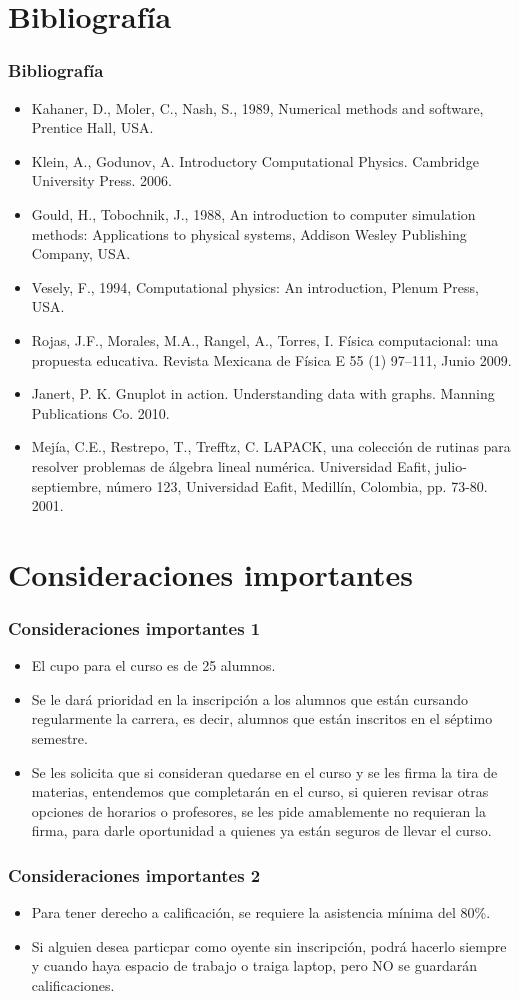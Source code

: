 \documentclass[12pt]{beamer}
\begin{document}
\section{Bibliografía}
\begin{frame}
\frametitle{Bibliografía}
\fontsize{10}{10}\selectfont
\begin{itemize}
\item Kahaner, D., Moler, C., Nash, S., 1989, Numerical methods and software, Prentice Hall, USA.
\item Klein, A., Godunov, A. Introductory Computational Physics. Cambridge University Press. 2006.
\item Gould, H., Tobochnik, J., 1988, An introduction to computer simulation methods: Applications to physical systems, Addison Wesley Publishing Company, USA.
\item Vesely, F., 1994, Computational physics: An introduction, Plenum Press, USA.
\item Rojas, J.F., Morales, M.A., Rangel, A., Torres, I. Física computacional: una propuesta educativa. Revista Mexicana de Física E 55 (1) 97–111, Junio 2009.
\item Janert, P. K. Gnuplot in action. Understanding data with graphs. Manning Publications Co. 2010.
\item Mejía, C.E., Restrepo, T., Trefftz, C. LAPACK, una colección de rutinas para resolver problemas de álgebra lineal numérica. Universidad Eafit, julio-septiembre, número 123, Universidad Eafit, Medillín, Colombia, pp. 73-80. 2001.
\end{itemize}
\end{frame}
\section{Consideraciones importantes}
\begin{frame}
\frametitle{Consideraciones importantes 1}
\begin{itemize}
\item El cupo para el curso es de 25 alumnos.
\item Se le dará prioridad en la inscripción a los alumnos que están cursando regularmente la carrera, es decir, alumnos que están inscritos en el séptimo semestre.
\item Se les solicita que si consideran quedarse en el curso y se les firma la tira de materias, entendemos que completarán en el curso, si quieren revisar otras opciones de horarios o profesores, se les pide amablemente no requieran la firma, para darle oportunidad a quienes ya están seguros de llevar el curso.
\end{itemize}
\end{frame}
\begin{frame}
\frametitle{Consideraciones importantes 2}
\begin{itemize}
\item Para tener derecho a calificación, se requiere la asistencia mínima del 80\%.
\item Si alguien desea particpar como oyente sin inscripción, podrá hacerlo siempre y cuando haya espacio de trabajo o traiga laptop, pero NO se guardarán calificaciones.
\end{itemize}
\end{frame}
\end{document}
